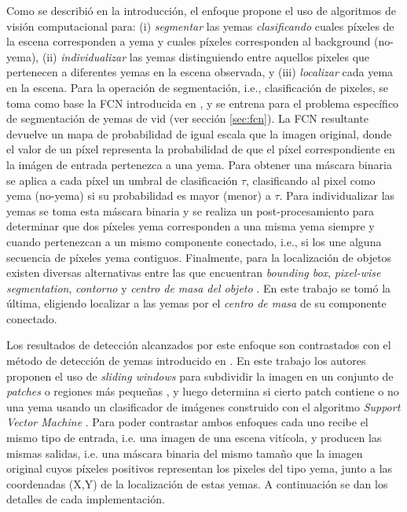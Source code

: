 \documentclass[a4paper,authoryear,review]{elsarticle}
\begin{document}
Como se describió en la introducción, el enfoque propone el uso de algoritmos de visión computacional para: (i) \emph{segmentar} las yemas \emph{clasificando} cuales píxeles de la escena corresponden a yema y cuales píxeles corresponden al background (no-yema), (ii) \emph{individualizar} las yemas distinguiendo entre aquellos pixeles que pertenecen a diferentes yemas en la escena observada, y (iii) \emph{localizar} cada yema en la escena. Para la operación de segmentación, i.e., clasificación de pixeles, se toma como base la FCN introducida en \citep{long2015fully}, y se entrena para el problema específico de segmentación de yemas de vid (ver sección \ref{sec:fcn}). La FCN resultante devuelve un mapa de probabilidad de igual escala que la imagen original, donde el valor de un píxel representa la probabilidad de que el píxel correspondiente en la imágen de entrada pertenezca a una yema. Para obtener una máscara binaria se aplica a cada píxel un umbral de clasificación $\tau$, clasificando al pixel como yema (no-yema) si su probabilidad es mayor (menor) a $\tau$. Para individualizar las yemas se toma esta máscara binaria y se realiza un post-procesamiento para determinar que dos píxeles yema corresponden a una misma yema siempre y cuando pertenezcan a un mismo componente conectado, i.e., si los une alguna secuencia de píxeles yema contiguos. Finalmente, para la localización de objetos existen diversas alternativas entre las que encuentran \emph{bounding box}, \emph{pixel-wise segmentation}, \emph{contorno} y \emph{centro de masa del objeto} \citep{lampert2008beyond}. En este trabajo se tomó la última, eligiendo localizar a las yemas por el \emph{centro de masa} de su componente conectado. 

Los resultados de detección alcanzados por este enfoque son contrastados con el método de detección de yemas introducido en \citet{perez2017image}. En este trabajo los autores proponen el uso de \emph{sliding windows} para subdividir la imagen en un conjunto de \emph{patches} o regiones más pequeñas \citep{perez2017image}, y luego determina si cierto patch contiene o no una yema usando un clasificador de imágenes construido con el algoritmo \emph{Support Vector Machine} \citep{vapnik2013nature}. Para poder contrastar ambos enfoques cada uno recibe el mismo tipo de entrada, i.e. una imagen de una escena vitícola, y producen las mismas salidas, i.e. una máscara binaria del mismo tamaño que la imagen original cuyos píxeles positivos representan los pixeles del tipo yema, junto a las coordenadas (X,Y) de la localización de estas yemas. A continuación se dan los detalles de cada implementación.
\end{document}
